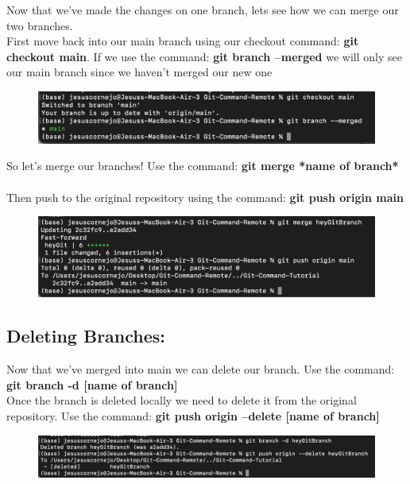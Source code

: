 \documentclass{article}
\begin{document}
Now that we've made the changes on one branch, lets see how we can merge our two branches.\\
First move back into our main branch using our checkout command: \textbf{git checkout main}. If we use the command: \textbf{git branch --merged} we will only see our main branch since we haven’t merged our new one\\

\begin{figure}[h]
\includegraphics[scale = 0.8]{screenshots/sc13.png}
\centering
\end{figure}

So let's merge our branches! Use the command: \textbf{git merge *name of branch*}\\ \\
Then push to the original repository using the command: \textbf{git push origin main}

\begin{figure}[h]
\includegraphics[scale = 0.7]{screenshots/sc14.png}
\centering
\end{figure}

\subsection{Deleting Branches:}
Now that we've merged into main we can delete our branch. Use the command: \textbf{git branch -d [name of branch]}\\
Once the branch is deleted locally we need to delete it from the original repository. Use the command: \textbf{git push origin --delete [name of branch]} \\

\begin{figure}[h]
\includegraphics[scale = 0.7]{screenshots/sc15.png}
\centering
\end{figure}
\end{document}
